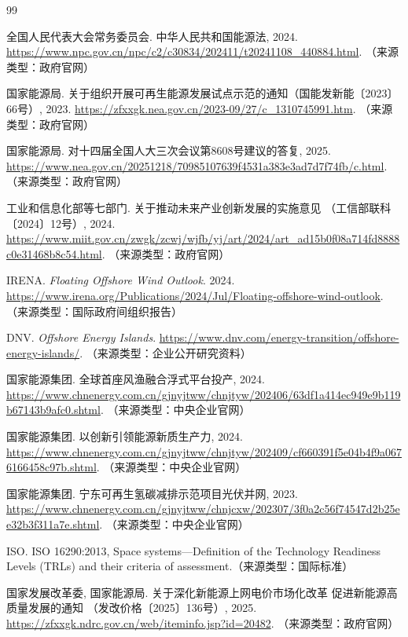 \begin{thebibliography}{99}

全国人民代表大会常务委员会. 中华人民共和国能源法, 2024.
\url{https://www.npc.gov.cn/npc/c2/c30834/202411/t20241108_440884.html}.
（来源类型：政府官网）

国家能源局. 关于组织开展可再生能源发展试点示范的通知（国能发新能〔2023〕66号）, 2023.
\url{https://zfxxgk.nea.gov.cn/2023-09/27/c_1310745991.htm}.
（来源类型：政府官网）

国家能源局. 对十四届全国人大三次会议第8608号建议的答复, 2025.
\url{https://www.nea.gov.cn/20251218/70985107639f4531a383e3ad7d7f74fb/c.html}.
（来源类型：政府官网）

工业和信息化部等七部门. 关于推动未来产业创新发展的实施意见
（工信部联科〔2024〕12号）, 2024.
\url{https://www.miit.gov.cn/zwgk/zcwj/wjfb/yj/art/2024/art_ad15b0f08a714fd8888c0e31468b8c54.html}.
（来源类型：政府官网）

IRENA. \emph{Floating Offshore Wind Outlook}. 2024.
\url{https://www.irena.org/Publications/2024/Jul/Floating-offshore-wind-outlook}.
（来源类型：国际政府间组织报告）

DNV. \emph{Offshore Energy Islands}.
\url{https://www.dnv.com/energy-transition/offshore-energy-islands/}.
（来源类型：企业公开研究资料）

国家能源集团. 全球首座风渔融合浮式平台投产, 2024.
\url{https://www.chnenergy.com.cn/gjnyjtww/chnjtyw/202406/63df1a414ec949e9b119b67143b9afc0.shtml}.
（来源类型：中央企业官网）

国家能源集团. 以创新引领能源新质生产力, 2024.
\url{https://www.chnenergy.com.cn/gjnyjtww/chnjtyw/202409/cf660391f5e04b4f9a0676166458c97b.shtml}.
（来源类型：中央企业官网）

国家能源集团. 宁东可再生氢碳减排示范项目光伏并网, 2023.
\url{https://www.chnenergy.com.cn/gjnyjtww/chnjcxw/202307/3f0a2c56f74547d2b25ee32b3f311a7e.shtml}.
（来源类型：中央企业官网）

ISO. ISO 16290:2013, Space systems---Definition of the Technology Readiness
Levels (TRLs) and their criteria of assessment.（来源类型：国际标准）

国家发展改革委, 国家能源局. 关于深化新能源上网电价市场化改革 促进新能源高质量发展的通知
（发改价格〔2025〕136号）, 2025.
\url{https://zfxxgk.ndrc.gov.cn/web/iteminfo.jsp?id=20482}.
（来源类型：政府官网）


\end{thebibliography}
